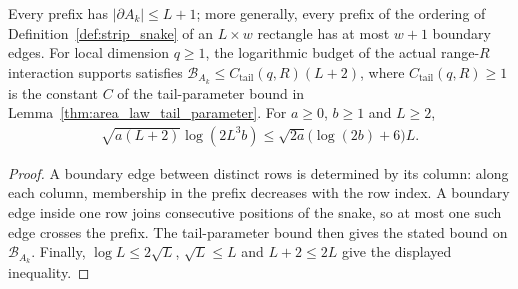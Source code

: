 \begin{lemma}
    \label{lem:snake_grid_cut_budget}
    \leanok
    Every prefix has $|\partial A_k|\le L+1$; more generally, every prefix
    of the ordering of Definition~\ref{def:strip_snake} of an $L\times w$
    rectangle has at most $w+1$ boundary edges. For local dimension
    $q\ge1$, the logarithmic budget of the actual range-$R$ interaction
    supports satisfies $\mathcal B_{A_k}\le C_{\mathrm{tail}}(q,R)(L+2)$,
    where $C_{\mathrm{tail}}(q,R)\ge1$ is the constant $C$ of the
    tail-parameter bound in Lemma~\ref{thm:area_law_tail_parameter}. For
    $a\ge0$, $b\ge1$ and $L\ge2$,
    \begin{align}
        \sqrt{a(L+2)}\log(2L^3b)
        \le \sqrt{2a}\bigl(\log(2b)+6\bigr)L.
    \end{align}
\end{lemma}
\begin{proof}
    \leanok
    A boundary edge between distinct rows is determined by its column:
    along each column, membership in the prefix decreases with the row
    index. A boundary edge inside one row joins consecutive positions
    of the snake, so at most one such edge crosses the prefix. The
    tail-parameter bound then gives the stated bound on
    $\mathcal B_{A_k}$. Finally, $\log L\le2\sqrt L$,
    $\sqrt L\le L$ and $L+2\le2L$ give the displayed inequality.
\end{proof}

